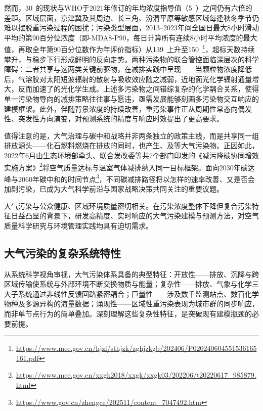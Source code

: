然而，30~\ug{}的现状与WHO于2021年修订的\PM 年均浓度指导值（5~\ug{}）之间仍有六倍的差距\citep{world2021global}。区域层面，京津冀及其周边、长三角、汾渭平原等敏感区域每逢秋冬季节仍难以摆脱重污染过程的困扰\citep{chen2020influence,cn_yanli2021quyu}；污染类型层面，2013--2023年间全国\ozone 日最大8小时滑动平均的第90百分位浓度（即\ozone-MDA8-P90，每日计算所有连续8小时平均浓度的最大值，再取全年第90百分位数作为年评价指标）从139~\ug{}上升至150~\ug{}\citep{MEE2024bulletin}\footnote{\url{https://www.mee.gov.cn/hjzl/sthjzk/zghjzkgb/202406/P020240604551536165161.pdf}}，\ozone 超标天数持续攀升，与\PM 稳步下行形成鲜明的反向走势\citep{wang2020contrasting,liu2023drivers}。两种污染物的联合管控面临深层次的科学障碍：二者共享\NOx 与\VOCs 这两类关键前驱物，在减排实践中呈现——当颗粒物浓度降低后，气溶胶对太阳短波辐射的散射与吸收效应随之减弱，近地面光化学辐射通量增大，反而加速了\ozone 的光化学生成\citep{qu2023underlying,li2023spatiotemporal,cn_lihong2019pm25o3}。上述多污染物之间错综复杂的化学耦合关系，使得单一污染物导向的减排策略往往事与愿违，亟需发展能够刻画多污染物交互响应的建模框架。此外，伴随背景浓度的持续改善，重污染事件正从周期性常态向偶发性、突发性方向演变，对预测系统的精度与响应时效提出了更高要求。

值得注意的是，大气治理与碳中和战略并非两条独立的政策主线，而是共享同一组排放源头——化石燃料燃烧在排放\COtwo 的同时，也产生\SOtwo、\NOx 及\PM 等大气污染物\citep{shi2022co,li2024synergistic}。正因如此，2022年6月由生态环境部牵头、联合发改委等共7个部门印发的《减污降碳协同增效实施方案》\footnote{\url{https://www.mee.gov.cn/xxgk2018/xxgk/xxgk03/202206/t20220617_985879.html}}将空气质量达标与温室气体减排纳入同一目标框架\citep{cn_guochangsheng2023xietong}。面向2030年碳达峰与2060年碳中和的时间节点\footnote{\url{https://www.gov.cn/zhengce/202511/content_7047492.htm}}，不同碳减排路径将以怎样的速率改善\PM 、又是否会加剧\ozone 污染，已成为大气科学前沿与国家战略决策共同关注的重要议题\citep{cheng2021pathways,sun2024air}。

大气污染与公众健康、区域环境质量密切相关。在污染浓度整体下降但复合污染特征日益凸显的背景下，研发高精度、实时响应的大气污染建模与预测方法，对空气质量科学研究与环境管理实践均具有迫切需求。

\subsection{大气污染的复杂系统特性}
\label{subsec:complex_system}

从系统科学视角审视，大气污染体系具备的典型特征\citep{xuesen1993new}：开放性——排放、沉降与跨区域传输使系统与外部环境不断交换物质与能量；复杂性——排放、气象与化学三大子系统通过非线性反馈回路紧密耦合；巨量性——涉及数千监测站点、数百化学物种及多源异构的海量数据；涌现性——区域性重污染表现为城市群的同步响应，而非单节点行为的简单叠加\citep{cn_wangshang2023}。深刻理解这些复杂性特征，是突破现有建模瓶颈的必要前提。

